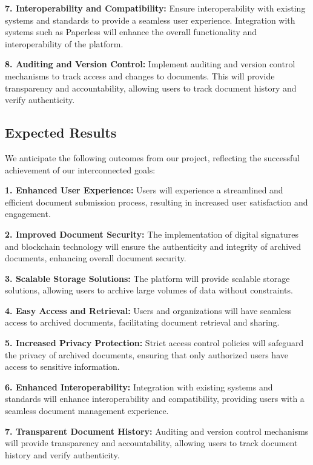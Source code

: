 \documentclass[a4paper,11pt]{article}
\begin{document}
        \textbf{7. Interoperability and Compatibility:}
        Ensure interoperability with existing systems and standards to provide a seamless user experience. Integration with systems such as Paperless will enhance the overall functionality and interoperability of the platform.
        
        \textbf{8. Auditing and Version Control:}
        Implement auditing and version control mechanisms to track access and changes to documents. This will provide transparency and accountability, allowing users to track document history and verify authenticity.
        
    \vspace{0.5cm}
    \subsection{Expected Results}
        We anticipate the following outcomes from our project, reflecting the successful achievement of our interconnected goals:
        
        \textbf{1. Enhanced User Experience:}
        Users will experience a streamlined and efficient document submission process, resulting in increased user satisfaction and engagement.
        
        \textbf{2. Improved Document Security:}
        The implementation of digital signatures and blockchain technology will ensure the authenticity and integrity of archived documents, enhancing overall document security.
        
        \textbf{3. Scalable Storage Solutions:}
        The platform will provide scalable storage solutions, allowing users to archive large volumes of data without constraints.
        
        \textbf{4. Easy Access and Retrieval:}
        Users and organizations will have seamless access to archived documents, facilitating document retrieval and sharing.
        
        \textbf{5. Increased Privacy Protection:}
        Strict access control policies will safeguard the privacy of archived documents, ensuring that only authorized users have access to sensitive information.
        
        \textbf{6. Enhanced Interoperability:}
        Integration with existing systems and standards will enhance interoperability and compatibility, providing users with a seamless document management experience.
        
        \textbf{7. Transparent Document History:}
        Auditing and version control mechanisms will provide transparency and accountability, allowing users to track document history and verify authenticity.
        
\end{document}

